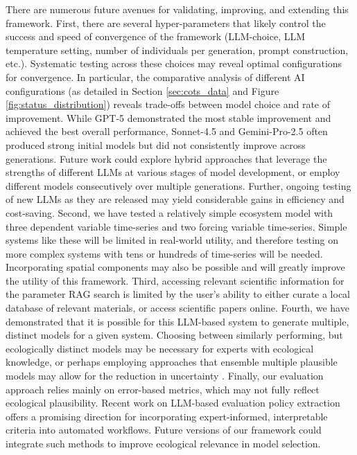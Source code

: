 There are numerous future avenues for validating, improving, and extending this framework. First, there are several hyper-parameters that likely control the success and speed of convergence of the framework (LLM-choice, LLM temperature setting, number of individuals per generation, prompt construction, etc.). Systematic testing across these choices may reveal optimal configurations for convergence. In particular, the comparative analysis of different AI configurations (as detailed in Section \ref{sec:cots_data} and Figure \ref{fig:status_distribution}) reveals trade-offs between model choice and rate of improvement. While GPT-5 demonstrated the most stable improvement and achieved the best overall performance, Sonnet-4.5 and Gemini-Pro-2.5 often produced strong initial models but did not consistently improve across generations. Future work could explore hybrid approaches that leverage the strengths of different LLMs at various stages of model development, or employ different models consecutively over multiple generations. Further, ongoing testing of new LLMs as they are released may yield considerable gains in efficiency and cost-saving. Second, we have tested a relatively simple ecosystem model with three dependent variable time-series and two forcing variable time-series. Simple systems like these will be limited in real-world utility, and therefore testing on more complex systems with tens or hundreds of time-series will be needed. Incorporating spatial components may also be possible and will greatly improve the utility of this framework. Third, accessing relevant scientific information for the parameter RAG search is limited by the user's ability to either curate a local database of relevant materials, or access scientific papers online. Fourth, we have demonstrated that it is possible for this LLM-based system to generate multiple, distinct models for a given system. Choosing between similarly performing, but ecologically distinct models may be necessary for experts with ecological knowledge, or perhaps employing approaches that ensemble multiple plausible models may allow for the reduction in uncertainty \citep{baker2017ensemble,gaardmark2013biological,vollert2024unlocking}. Finally, our evaluation approach relies mainly on error-based metrics, which may not fully reflect ecological plausibility. Recent work on LLM-based evaluation policy extraction \citep{cheng2025llm} offers a promising direction for incorporating expert-informed, interpretable criteria into automated workflows. Future versions of our framework could integrate such methods to improve ecological relevance in model selection.

